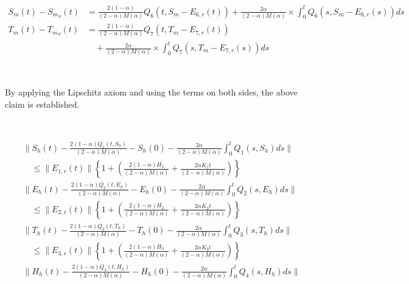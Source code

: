\documentclass[10pt]{NSP1}
\begin{document}
\begin{equation}
\begin{aligned}
S_{m}(t) - {S_{m}}_{r}(t) &= \frac{2(1 - \alpha)}{(2 - \alpha)M(\alpha)}Q_{6}\left( t,S_{m} - E_{6,r}(t) \right) + \frac{2\alpha}{(2 - \alpha)M(\alpha)} \times \int_{0}^{t}{}Q_{6}\left( s,S_{m} - E_{6,r}(s) \right)ds \\
T_{m}(t) - {T_{m}}_{r}(t) &= \frac{2(1 - \alpha)}{(2 - \alpha)M(\alpha)}Q_{7}\left( t,T_{m} - E_{7,r}(t) \right) \\
&\quad + \frac{2\alpha}{(2 - \alpha)M(\alpha)} \times \int_{0}^{t}{}Q_{7}\left( s,T_{m} - E_{7,r}(s) \right)ds
\end{aligned}
\end{equation}


~


By applying the Lipschitz axiom and using the terms on both sides, the above claim is established.


~


{\small
\[
\begin{aligned}
&\| S_{h}(t) - \frac{2(1 - \alpha)Q_{1}\left( t,S_{h} \right)}{(2 - \alpha)M(\alpha)} - S_{h}(0) - \frac{2\alpha}{(2 - \alpha)M(\alpha)}\int_{0}^{t}{}Q_{1}\left( s,S_{h} \right)ds\| \\
&\quad \leq \| E_{1,r}(t)\|\left\{ 1 + \left( \frac{2(1 - \alpha)H_{1}}{(2 - \alpha)M(\alpha)} + \frac{2\alpha K_{1}t}{(2 - \alpha)M(\alpha)} \right) \right\} \\
&\| E_{h}(t) - \frac{2(1 - \alpha)Q_{2}\left( t,E_{h} \right)}{(2 - \alpha)M(\alpha)} - E_{h}(0) - \frac{2\alpha}{(2 - \alpha)M(\alpha)}\int_{0}^{t}{}Q_{2}\left( s,E_{h} \right)ds\| \\
&\quad \leq \| E_{2,r}(t)\|\left\{ 1 + \left( \frac{2(1 - \alpha)H_{2}}{(2 - \alpha)M(\alpha)} + \frac{2\alpha K_{2}t}{(2 - \alpha)M(\alpha)} \right) \right\} \\
&\| T_{h}(t) - \frac{2(1 - \alpha)Q_{3}\left( t,T_{h} \right)}{(2 - \alpha)M(\alpha)} - T_{h}(0) - \frac{2\alpha}{(2 - \alpha)M(\alpha)}\int_{0}^{t}{}Q_{3}\left( s,T_{h} \right)ds\| \\
&\quad \leq \| E_{3,r}(t)\|\left\{ 1 + \left( \frac{2(1 - \alpha)H_{3}}{(2 - \alpha)M(\alpha)} + \frac{2\alpha K_{3}t}{(2 - \alpha)M(\alpha)} \right) \right\} \\
&\| H_{h}(t) - \frac{2(1 - \alpha)Q_{4}\left( t,H_{h} \right)}{(2 - \alpha)M(\alpha)} - H_{h}(0) - \frac{2\alpha}{(2 - \alpha)M(\alpha)}\int_{0}^{t}{}Q_{4}\left( s,H_{h} \right)ds\|
\end{aligned}
\]
}
\end{document}
